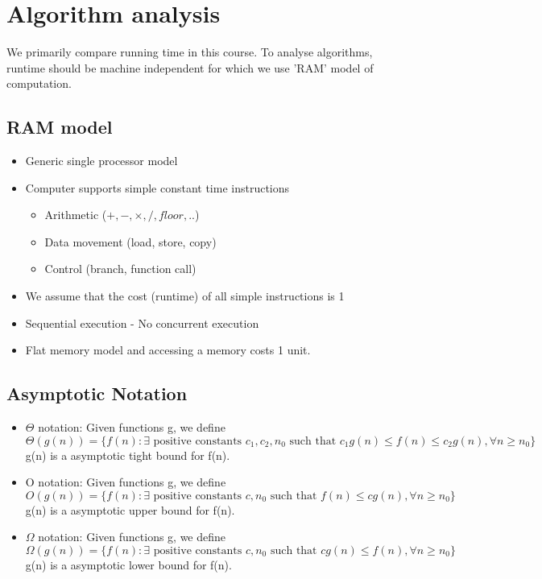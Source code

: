 \documentclass{article}
\begin{document}
\section{Algorithm analysis}
	We primarily compare running time in this course. To analyse algorithms, runtime should be machine independent for which we use 'RAM' model of computation.
	\subsection{RAM model}
	\begin{itemize}
		\item Generic single processor model
		\item Computer supports simple constant time instructions
		\begin{itemize}
			\item Arithmetic ($+,-,\times,/,floor,..$)
			\item Data movement (load, store, copy)
			\item Control (branch, function call)
		\end{itemize}
		\item We assume that the cost (runtime) of all simple instructions is 1
		\item Sequential execution - No concurrent execution
		\item Flat memory model and accessing a memory costs 1 unit.
	\end{itemize}
	\subsection{Asymptotic Notation}
	\begin{itemize}
		\item $\Theta$ notation: Given functions g, we define
		\[\Theta(g(n)) = \{f(n) : \exists \text{ positive constants } c_1,c_2,n_0 \text{ such that } c_1g(n) \leq f(n) \leq c_2g(n), \forall n\geq n_0 \}\]
		g(n) is a asymptotic tight bound for f(n).
		\item O notation: Given functions g, we define
		\[O(g(n)) = \{f(n) : \exists\text{ positive constants }c,n_0 \text{ 	such that }  f(n)\leq cg(n), \forall n\geq n_0 \}\]
		g(n) is a asymptotic upper bound for f(n).
		\item $\Omega$ notation: Given functions g, we define
		\[\Omega(g(n)) = \{f(n) : \exists\text{ positive constants }c,n_0 \text{ such that } cg(n)\leq f(n), \forall n\geq n_0\} \]
		g(n) is a asymptotic lower bound for f(n).











	\end{itemize}
\end{document}
